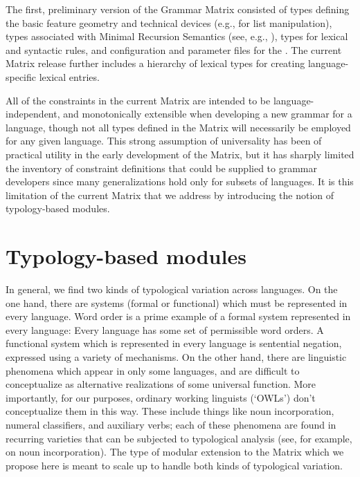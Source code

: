 The first, preliminary version of the Grammar Matrix 
consisted of types defining the basic feature geometry and technical
devices (e.g., for list manipulation), types associated with Minimal
Recursion Semantics (see, e.g., \cite{Cop:Las:Fli:01}), types for
lexical and syntactic rules, and configuration and parameter
files for the \lkb.  The current Matrix release further 
includes a hierarchy of lexical types for creating language-specific 
lexical entries.

All of the constraints in the current Matrix are intended to be 
language-independent, and monotonically extensible when developing a
new grammar for a language, though not all types defined in the Matrix
will necessarily be employed for any given language.  This strong 
assumption of universality has been of practical utility in the early
development of the Matrix, but it has sharply limited the inventory of
constraint definitions that could be supplied to grammar developers
since many generalizations hold only for subsets of languages.  It is
this limitation of the current Matrix that we address by introducing
the notion of typology-based modules.

\section{Typology-based modules}

In general, we find two kinds of typological variation across
languages.  On the one hand, there are systems (formal or functional)
which must be represented in every language.  Word order is a prime
example of a formal system represented in every language: Every
language has some set of permissible word orders.
A functional system which is represented in every language is
sentential negation, expressed using a variety of mechanisms.  On 
the other hand, there are linguistic
phenomena which appear in only some languages, and are difficult to
conceptualize as alternative realizations of some universal function.  More
importantly, for our purposes, ordinary working linguists (`OWLs')
don't conceptualize them in this way.  These include things like
noun incorporation, numeral classifiers, and auxiliary verbs; each of
these phenomena are found in recurring varieties that can be 
subjected to typological
analysis (see, for example, \cite{Mithun:84} on noun incorporation).
The type of modular extension to the Matrix which we propose here
is meant to scale up to handle both kinds of typological variation.

